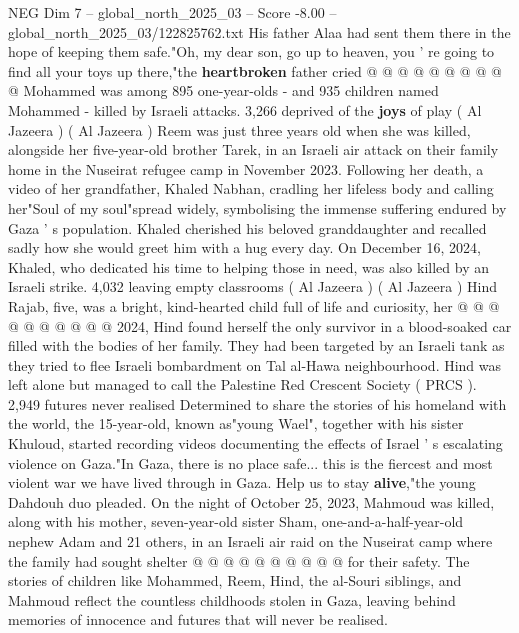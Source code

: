 \begin{textsample}{NEG Dim 7 – global\_north\_2025\_03 – Score -8.00 – global\_north\_2025\_03/122825762.txt}
His father Alaa had sent them there in the hope of keeping them safe."Oh, my dear son, go up to heaven, you ' re going to find all your toys up there,"the \textbf{heartbroken} father cried @ @ @ @ @ @ @ @ @ @ Mohammed was among 895 one-year-olds - and 935 children named Mohammed - killed by Israeli attacks. 3,266 deprived of the \textbf{joys} of play ( Al Jazeera ) ( Al Jazeera ) Reem was just three years old when she was killed, alongside her five-year-old brother Tarek, in an Israeli air attack on their family home in the Nuseirat refugee camp in November 2023.
Following her death, a video of her grandfather, Khaled Nabhan, cradling her lifeless body and calling her"Soul of my soul"spread widely, symbolising the immense suffering endured by Gaza ' s population.
Khaled cherished his beloved granddaughter and recalled sadly how she would greet him with a hug every day.
On December 16, 2024, Khaled, who dedicated his time to helping those in need, was also killed by an Israeli strike. 4,032 leaving empty classrooms ( Al Jazeera ) ( Al Jazeera ) Hind Rajab, five, was a bright, kind-hearted child full of life and curiosity, her @ @ @ @ @ @ @ @ @ @ 2024, Hind found herself the only survivor in a blood-soaked car filled with the bodies of her family.
They had been targeted by an Israeli tank as they tried to flee Israeli bombardment on Tal al-Hawa neighbourhood.
Hind was left alone but managed to call the Palestine Red Crescent Society ( PRCS ). 2,949 futures never realised Determined to share the stories of his homeland with the world, the 15-year-old, known as"young Wael", together with his sister Khuloud, started recording videos documenting the effects of Israel ' s escalating violence on Gaza."In Gaza, there is no place safe... this is the fiercest and most violent war we have lived through in Gaza.
Help us to stay \textbf{alive},"the young Dahdouh duo pleaded.
On the night of October 25, 2023, Mahmoud was killed, along with his mother, seven-year-old sister Sham, one-and-a-half-year-old nephew Adam and 21 others, in an Israeli air raid on the Nuseirat camp where the family had sought shelter @ @ @ @ @ @ @ @ @ @ for their safety.
The stories of children like Mohammed, Reem, Hind, the al-Souri siblings, and Mahmoud reflect the countless childhoods stolen in Gaza, leaving behind memories of innocence and futures that will never be realised.

\end{textsample}
